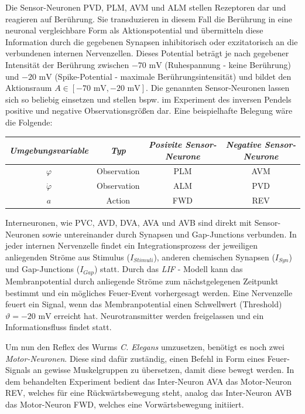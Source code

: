 	Die Sensor-Neuronen PVD, PLM, AVM und ALM stellen Rezeptoren dar und reagieren auf Berührung. Sie transduzieren in diesem Fall die Berührung in eine neuronal vergleichbare Form als Aktionspotential und übermitteln diese Information durch die gegebenen Synapsen inhibitorisch oder exzitatorisch an die verbundenen internen Nervenzellen. Dieses Potential beträgt je nach gegebener Intensität der Berührung zwischen $-70\text{ mV}$ (Ruhespannung - keine Berührung) und $-20\text{ mV}$ (Spike-Potential - maximale Berührungsintensität) und bildet den Aktionsraum $A\in[-70\text{ mV}, -20\text{ mV}]$. Die genannten Sensor-Neuronen lassen sich so beliebig einsetzen und stellen bspw. im Experiment des inversen Pendels positive und negative Observationsgrößen dar. Eine beispielhafte Belegung wäre die Folgende:
	\begin{center}
	\begin{tabular}{c@{\hskip 0.5cm}c@{\hskip 0.5cm}c@{\hskip 0.5cm}c}    \toprule
		\setlength{\tabcolsep}{50pt}
		\renewcommand{\arraystretch}{1.5}
		\emph{Umgebungsvariable} & \emph{Typ}  & \emph{Posivite Sensor-Neurone} & \emph{Negative Sensor-Neurone} \\\midrule
		$\varphi$ 				 & Observation & PLM							& AVM							 \\ 
		$\dot{\varphi}$		 	 & Observation & ALM							& PVD							 \\
		$a$						 & Action	   & FWD							& REV							 \\\bottomrule
		\hline
	\end{tabular}
	\end{center}
	Interneuronen, wie PVC, AVD, DVA, AVA und AVB sind direkt mit Sensor-Neuronen sowie untereinander durch Synapsen und Gap-Junctions verbunden. In jeder internen Nervenzelle findet ein Integrationsprozess der jeweiligen anliegenden Ströme aus Stimulus ($I_{Stimuli}$), anderen chemischen Synapsen ($I_{Syn}$) und Gap-Junctions ($I_{Gap}$) statt. Durch das \textit{LIF} - Modell kann das Membranpotential durch anliegende Ströme zum nächstgelegenen Zeitpunkt bestimmt und ein mögliches Feuer-Event vorhergesagt werden. Eine Nervenzelle feuert ein Signal, wenn das Membranpotential einen Schwellwert (\glqq Threshold\grqq) $\vartheta = -20\text{ mV}$ erreicht hat. Neurotransmitter werden freigelassen und ein Informationsfluss findet statt.
	
	Um nun den Reflex des Wurms \textit{C. Elegans} umzusetzen, benötigt es noch zwei \textit{Motor-Neuronen}. Diese sind dafür zuständig, einen Befehl in Form eines Feuer-Signals an gewisse Muskelgruppen zu übersetzen, damit diese bewegt werden. In dem behandelten Experiment bedient das Inter-Neuron AVA das Motor-Neuron REV, welches für eine Rückwärtsbewegung steht, analog das Inter-Neuron AVB das Motor-Neuron FWD, welches eine Vorwärtsbewegung initiiert.
	
